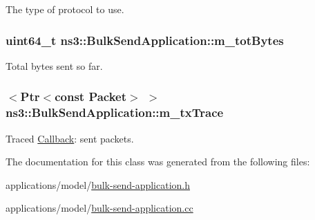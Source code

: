 The type of protocol to use. 

\subsubsection[{\texorpdfstring{m\+\_\+tot\+Bytes}{m_totBytes}}]{\setlength{\rightskip}{0pt plus 5cm}uint64\+\_\+t ns3\+::\+Bulk\+Send\+Application\+::m\+\_\+tot\+Bytes\hspace{0.3cm}{\ttfamily [private]}}\hypertarget{classns3_1_1BulkSendApplication_ac59c8703121edfc01fcbf812088d0944}{}\label{classns3_1_1BulkSendApplication_ac59c8703121edfc01fcbf812088d0944}


Total bytes sent so far. 

\subsubsection[{\texorpdfstring{m\+\_\+tx\+Trace}{m_txTrace}}]{$<${\bf Ptr}$<$const {\bf Packet}$>$ $>$ ns3\+::\+Bulk\+Send\+Application\+::m\+\_\+tx\+Trace\hspace{0.3cm}{\ttfamily [private]}}\hypertarget{classns3_1_1BulkSendApplication_a982bb90de3aab9858bc23c1fd3e5987e}{}\label{classns3_1_1BulkSendApplication_a982bb90de3aab9858bc23c1fd3e5987e}


Traced \hyperlink{classns3_1_1Callback}{Callback}\+: sent packets. 



The documentation for this class was generated from the following files\+:\begin{DoxyCompactItemize}
\item 
applications/model/\hyperlink{bulk-send-application_8h}{bulk-\/send-\/application.\+h}\item 
applications/model/\hyperlink{bulk-send-application_8cc}{bulk-\/send-\/application.\+cc}\end{DoxyCompactItemize}
